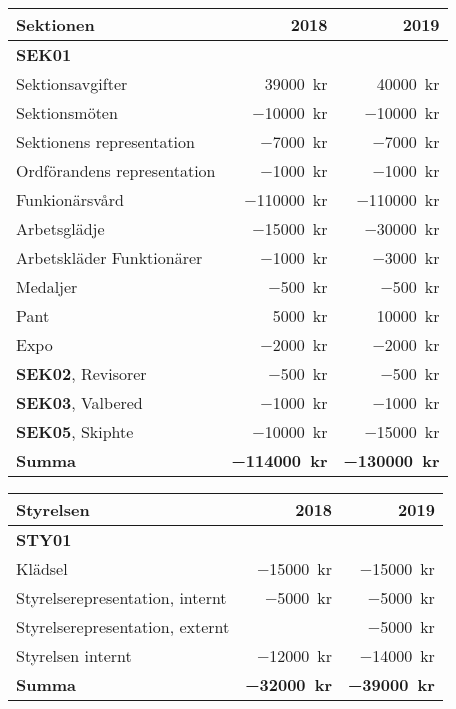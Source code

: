 \documentclass[10pt]{article}
\begin{document}
    \section*{\doctitle}
    \begin{tabularx}{10cm}{X r r}
        \textbf{\large Sektionen} & \textbf{2018} & \textbf{2019} \\
        \hline
        \textbf{SEK01} \\
        Sektionsavgifter & \SI{39000}{kr} & \SI{40000}{kr} \\
        Sektionsmöten & \SI{-10000}{kr} & \SI{-10000}{kr} \\
        Sektionens representation & \SI{-7000}{kr} & \SI{-7000}{kr} \\
        Ordförandens representation & \SI{-1000}{kr} & \SI{-1000}{kr} \\
        Funkionärsvård & \SI{-110000}{kr} & \SI{-110000}{kr} \\
        Arbetsglädje & \SI{-15000}{kr} & \SI{-30000}{kr} \\
        Arbetskläder Funktionärer & \SI{-1000}{kr} & \SI{-3000}{kr} \\
        Medaljer & \SI{-500}{kr} & \SI{-500}{kr} \\
        Pant & \SI{5000}{kr} & \SI{10000}{kr} \\
        Expo & \SI{-2000}{kr} & \SI{-2000}{kr} \\
        \textbf{SEK02}, Revisorer & \SI{-500}{kr} & \SI{-500}{kr} \\
        \textbf{SEK03}, Valbered & \SI{-1000}{kr} & \SI{-1000}{kr} \\
        \textbf{SEK05}, Skiphte & \SI{-10000}{kr} & \SI{-15000}{kr} \\
        \hline
        \textbf{Summa} & \textbf{\SI{-114000}{kr}} & \textbf{\SI{-130000}{kr}} \\
    \end{tabularx}
    
    \begin{tabularx}{10cm}{X r r}
        \textbf{\large Styrelsen} & \textbf{2018} & \textbf{2019} \\
        \hline
        \textbf{STY01} \\
        Klädsel & \SI{-15000}{kr} & \SI{-15000}{kr} \\
        Styrelserepresentation, internt & \SI{-5000}{kr} & \SI{-5000}{kr} \\
        Styrelserepresentation, externt & \SI{}{} & \SI{-5000}{kr} \\
        Styrelsen internt & \SI{-12000}{kr} & \SI{-14000}{kr} \\
        \hline
        \textbf{Summa} & \textbf{\SI{-32000}{kr}} & \textbf{\SI{-39000}{kr}} \\
    \end{tabularx}
    
\end{document}
